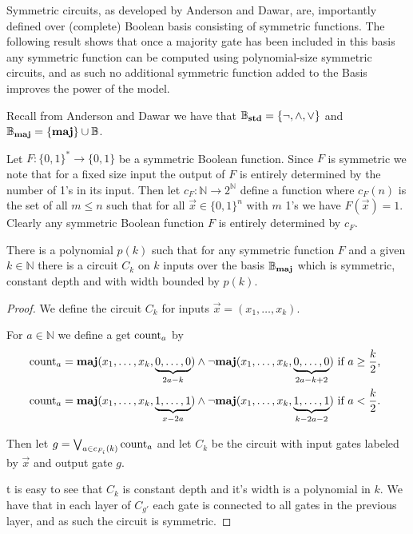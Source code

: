 \documentclass[../paper.tex]{subfiles}
\begin{document}
Symmetric circuits, as developed by Anderson and Dawar, are, importantly defined
over (complete) Boolean basis consisting of symmetric functions. The following
result shows that once a majority gate has been included in this basis any
symmetric function can be computed using polynomial-size symmetric circuits, and
as such no additional symmetric function added to the Basis improves the power
of the model.

Recall from Anderson and Dawar \cite{AndersonD17} we have that $\mathbb{B}_{\text{\textbf{std}}} = \{
\neg , \wedge , \lor \}$ and $\mathbb{B}_{\text{\textbf{maj}}} = \{ \text{\textbf{maj}} \} \cup \mathbb{B}$.

Let $F: \{0,1\}^* \rightarrow \{0,1\}$ be a symmetric Boolean function. Since
$F$ is symmetric we note that for a fixed size input the output of $F$ is
entirely determined by the number of 1's in its input. Then let
$c_{F}:\mathbb{N} \rightarrow 2^{\mathbb{N}}$ define a function where $c_{F}(n)$
is the set of all $m \leq n$ such that for all $\vec{x} \in \{ 0,1 \}^n$ with
$m$ 1's we have $F (\vec{x}) = 1$. Clearly any symmetric Boolean function $F$ is
entirely determined by $c_{F}$.
 
\begin{prop}
  \label{prop:fuctions-maj}
  There is a polynomial $p(k)$ such that for any symmetric function $F$ and a
  given $k \in \mathbb{N}$ there is a circuit $C_k$ on $k$ inputs over the basis
  $\mathbb{B}_{\text{\textbf{maj}}}$ which is symmetric, constant depth and with width bounded by
  $p(k)$.
\end{prop}

\begin{proof}
  We define the circuit $C_k$ for inputs $\vec{x} = ( x_1, \ldots, x_k )$.

  For $a \in \mathbb{N}$ we define a get $\text{count}_a$ by
  \begin{align*}
    &\text{count}_a = \text{\textbf{maj}} (x_1, \ldots, x_k, \underbrace {0, \ldots, 0}_{2a -
      k}) \land \neg \text{\textbf{maj}} (x_1, \ldots , x_k, \underbrace{0, \ldots,  0}_{2a - k + 2})\text{ if $a \geq \frac{k}{2}$,} \\
    &\text{count}_a = \text{\textbf{maj}} (x_1, \ldots, x_k, \underbrace {1, \ldots, 1}_{x -
      2a}) \land \neg \text{\textbf{maj}} (x_1, \ldots , x_k, \underbrace{1, \ldots,
      1}_{k - 2a -2}) \text{ if $a < \frac{k}{2}$. }
  \end{align*}

  Then let $g = \bigvee_{a \in c_{F_i}(k)}\text{count}_a$ and let $C_{k}$ be the
  circuit with input gates labeled by $\vec{x}$ and output gate $g$.

  t is easy to see that $C_k$ is constant depth and it's width is a polynomial
  in $k$. We have that in each layer of $C_{g'}$ each gate is connected to all
  gates in the previous layer, and as such the circuit is symmetric.
\end{proof}
\end{document}
